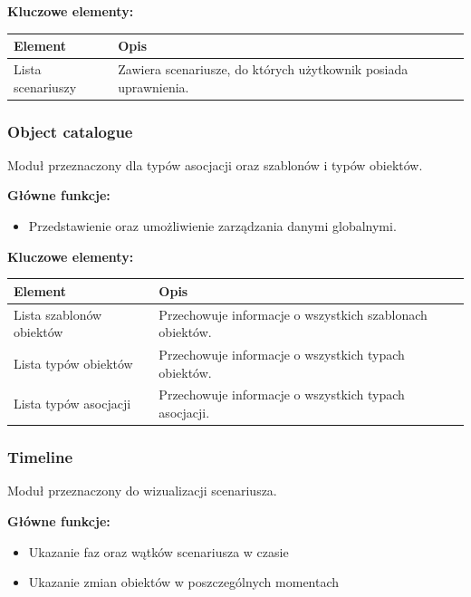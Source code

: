 \textbf{Kluczowe elementy:}
\begin{table}[H]
    \centering
    \begin{tabular}{|l|p{10cm}|}
        \hline
        \textbf{Element} & \textbf{Opis} \\
        \hline
        Lista scenariuszy & Zawiera scenariusze, do których użytkownik posiada uprawnienia. \\
        \hline
    \end{tabular}
\end{table}

\vspace{1em}

\subsubsection*{Object catalogue}
Moduł przeznaczony dla typów asocjacji oraz szablonów i typów obiektów.

\textbf{Główne funkcje:}
\begin{itemize}
    \item Przedstawienie oraz umożliwienie zarządzania danymi globalnymi.
\end{itemize}

\textbf{Kluczowe elementy:}
\begin{table}[H]
    \centering
    \begin{tabular}{|l|p{10cm}|}
        \hline
        \textbf{Element} & \textbf{Opis} \\
        \hline
        Lista szablonów obiektów & Przechowuje informacje o wszystkich szablonach obiektów. \\
        \hline
        Lista typów obiektów & Przechowuje informacje o wszystkich typach obiektów. \\
        \hline
        Lista typów asocjacji & Przechowuje informacje o wszystkich typach asocjacji. \\
        \hline
    \end{tabular}
\end{table}

\vspace{1em}

\subsubsection*{Timeline}
Moduł przeznaczony do wizualizacji scenariusza.

\textbf{Główne funkcje:}
\begin{itemize}
    \item Ukazanie faz oraz wątków scenariusza w czasie
    \item Ukazanie zmian obiektów w poszczególnych momentach
\end{itemize}


